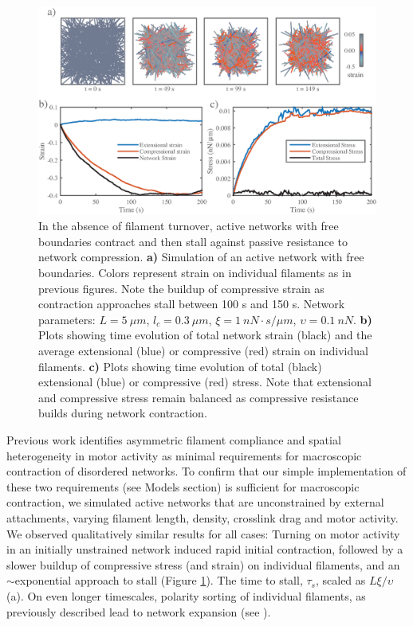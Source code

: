 \documentclass[10pt,letterpaper]{article}
\begin{document}
\begin{figure}[h!]
	\centering
	\includegraphics[width=\hsize]{figures/figure5}
	\caption{\label{fig:active_con} In the absence of filament turnover, active networks with free boundaries contract and then stall against passive resistance to network compression. \textbf{a)}  Simulation of an active network with free boundaries. Colors represent strain on individual filaments as in previous figures.  Note the buildup of compressive strain as contraction approaches stall between 100 s and 150 s.  Network parameters: $L=5\: \mu m$, $l_c=0.3\: \mu m$, $\xi=1\: nN\cdot s/\mu m$, $\upsilon=0.1\: nN$.  \textbf{b)} Plots showing time evolution of total network strain (black) and the average extensional (blue) or compressive (red) strain on individual filaments.   \textbf{c)} Plots showing time evolution of total (black) extensional (blue) or compressive (red) stress.  Note that extensional and compressive stress remain balanced as compressive resistance builds during network contraction.}
\end{figure}

Previous work \cite{1367-2630-14-3-033037,rheo_2D1,rheo_active} identifies asymmetric filament compliance and spatial heterogeneity in motor activity as minimal requirements for macroscopic contraction of disordered networks. To confirm that our simple implementation of these two requirements (see Models section) is sufficient for macroscopic contraction, we simulated active networks that are unconstrained by external attachments, varying filament length, density, crosslink drag and motor activity.  We observed qualitatively similar results for all cases:  Turning on motor activity in an initially unstrained network induced rapid initial contraction, followed by a slower buildup of compressive stress (and strain) on individual filaments, and an $\sim$exponential approach to stall (Figure \ref{fig:active_con}). The time to stall, $\tau_s$, scaled as $L\xi/\upsilon$ (a). On even longer timescales, polarity sorting of individual filaments, as previously described \cite{Reymann1310,Murrell15062014,Ndlec:1997aa,Surrey1167} lead to network expansion (see ).
\end{document}
